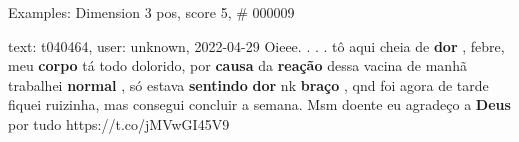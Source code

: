 \begin{frame}{Examples: Dimension 3 pos, score 5, \# 000009}
\footnotesize
\begin{exampleblock}{text: t040464, user: unknown, 2022-04-29}
Oieee. . . . tô aqui cheia de \textbf{dor} , febre, meu \textbf{corpo} tá todo 
dolorido, por \textbf{causa} da \textbf{reação} dessa vacina 
 de manhã trabalhei \textbf{normal} , só estava 
\textbf{sentindo} \textbf{dor} nk \textbf{braço} , qnd foi agora de tarde 
fiquei ruizinha, mas consegui concluir a semana. Msm doente eu agradeço a 
\textbf{Deus} por tudo   
https://t.co/jMVwGI45V9 
\end{exampleblock}
\end{frame}

